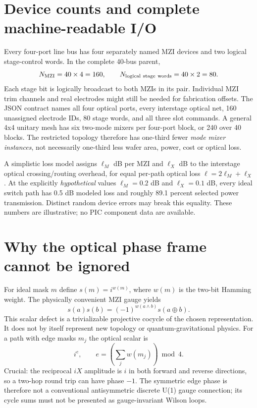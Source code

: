 \documentclass[10pt]{article}
\begin{document}
\section{Device counts and complete machine-readable I/O}
Every four-port line bus has four separately named MZI
devices and two logical stage-control words. In the complete
40-bus parent,
\[
N_{\rm MZI}=40\times4=160,\qquad
N_{\rm logical\ stage\ words}=40\times2=80.
\]
Each stage bit is logically broadcast to both MZIs in its
pair. Individual MZI trim channels and real electrodes might
still be needed for fabrication offsets. The JSON contract names
all four optical ports, every interstage optical net,
160 unassigned electrode IDs, 80 stage words, and all three
slot commands. A general 4x4 unitary mesh has six two-mode
mixers per four-port block, or 240 over 40 blocks. The
restricted topology therefore has one-third fewer \emph{mode
mixer instances}, not necessarily one-third less wafer
area, power, cost or optical loss.

A simplistic loss model assigns $\ell_M$ dB per MZI and
$\ell_X$ dB to the interstage optical crossing/routing
overhead, for equal per-path optical loss
$\ell=2\ell_M+\ell_X$. At the explicitly \emph{hypothetical}
values $\ell_M=0.2$ dB and $\ell_X=0.1$ dB, every ideal
switch path has 0.5 dB modeled loss and roughly
89.1 percent selected power transmission. Distinct random
device errors may break this equality. These numbers are
illustrative; no PIC component data are available.

\section{Why the optical phase frame cannot be ignored}
For ideal mask $m$ define $s(m)=i^{w(m)}$, where $w(m)$
is the two-bit Hamming weight. The physically convenient
MZI gauge yields
\[
s(a)s(b)=(-1)^{w(a\wedge b)}s(a\oplus b).
\]
This scalar defect is a trivializable projective cocycle
of the chosen representation. It does not by itself
represent new topology or quantum-gravitational physics.
For a path with edge masks $m_j$ the optical scalar is
\[
i^e,\qquad e=\left(\sum_jw(m_j)\right)\bmod4.
\]
Crucial: the reciprocal $iX$ amplitude is $i$ in both
forward and reverse directions, so a two-hop round trip
can have phase $-1$. The symmetric edge phase is therefore
not a conventional antisymmetric discrete U(1) gauge connection;
its cycle sums must not be presented as gauge-invariant
Wilson loops.
\end{document}
